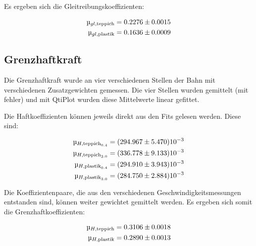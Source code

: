 Es ergeben sich die Gleitreibungskoeffizienten:

\begin{align*}
    \micro_{gl,\textrm{teppich}} &= 0.2276 \pm 0.0015 \\
    \micro_{gl,\textrm{plastik}} &= 0.1636 \pm 0.0009
\end{align*}


\subsection{Grenzhaftkraft}

Die   Grenzhaftkraft  wurde  an  vier  verschiedenen  Stellen   der   Bahn   mit
verschiedenen  Zusatzgewichten gemessen. Die vier Stellen wurden gemittelt  (mit
fehler)   und   mit   QtiPlot   wurden   diese  Mittelwerte   linear   gefittet.

Die Haftkoeffizienten k\"onnen jeweils direkt aus den Fits gelesen werden. Diese
sind:

\begin{align*}
    \micro_{H,\textrm{teppich}_{0.4}} &= (294.967 \pm 5.470)\num{e-3} \\
    \micro_{H,\textrm{teppich}_{3.0}} &= (336.778 \pm 9.133)\num{e-3} \\
    \micro_{H,\textrm{plastik}_{0.4}} &= (294.910 \pm 3.943)\num{e-3} \\
    \micro_{H,\textrm{plastik}_{3.0}} &= (284.750 \pm 2.884)\num{e-3}
\end{align*}

Die Koeffizientenpaare,  die  aus  den  verschiedenen  Geschwindigkeitsmessungen
entstanden  sind,  k\"onnen  weiter  gewichtet gemittelt werden. Es ergeben sich
somit die Grenzhaftkoeffizienten:

\begin{align*}
    \micro_{H,\textrm{teppich}} &= 0.3106 \pm 0.0018 \\
    \micro_{H,\textrm{plastik}} &= 0.2890 \pm 0.0013
\end{align*}


